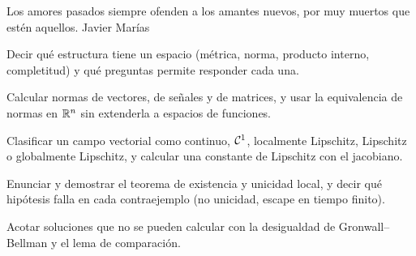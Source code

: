 
  {Los amores pasados siempre ofenden a los amantes nuevos, por muy muertos que estén aquellos.}
  {Javier Marías}

\begin{objetivos}
  \item Decir qué estructura tiene un espacio (métrica, norma, producto interno, completitud) y qué preguntas permite responder cada una.
  \item Calcular normas de vectores, de señales y de matrices, y usar la equivalencia de normas en $\mathbb{R}^n$ sin extenderla a espacios de funciones.
  \item Clasificar un campo vectorial como continuo, $\mathcal{C}^{1}$, localmente Lipschitz, Lipschitz o globalmente Lipschitz, y calcular una constante de Lipschitz con el jacobiano.
  \item Enunciar y demostrar el teorema de existencia y unicidad local, y decir qué hipótesis falla en cada contraejemplo (no unicidad, escape en tiempo finito).
  \item Acotar soluciones que no se pueden calcular con la desigualdad de Gronwall--Bellman y el lema de comparación.
\end{objetivos}












